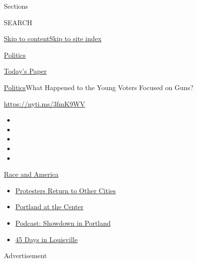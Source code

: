 Sections

SEARCH

\protect\hyperlink{site-content}{Skip to
content}\protect\hyperlink{site-index}{Skip to site index}

\href{https://www.nytimes.com/section/politics}{Politics}

\href{https://myaccount.nytimes.com/auth/login?response_type=cookie\&client_id=vi}{}

\href{https://www.nytimes.com/section/todayspaper}{Today's Paper}

\href{/section/politics}{Politics}\textbar{}What Happened to the Young
Voters Focused on Guns?

\url{https://nyti.ms/3fmK9WV}

\begin{itemize}
\item
\item
\item
\item
\item
\end{itemize}

\href{https://www.nytimes.com/news-event/george-floyd-protests-minneapolis-new-york-los-angeles?action=click\&pgtype=Article\&state=default\&region=TOP_BANNER\&context=storylines_menu}{Race
and America}

\begin{itemize}
\tightlist
\item
  \href{https://www.nytimes.com/2020/07/26/us/protests-portland-seattle-trump.html?action=click\&pgtype=Article\&state=default\&region=TOP_BANNER\&context=storylines_menu}{Protesters
  Return to Other Cities}
\item
  \href{https://www.nytimes.com/2020/07/24/us/portland-oregon-protests-white-race.html?action=click\&pgtype=Article\&state=default\&region=TOP_BANNER\&context=storylines_menu}{Portland
  at the Center}
\item
  \href{https://www.nytimes.com/2020/07/23/podcasts/the-daily/portland-protests.html?action=click\&pgtype=Article\&state=default\&region=TOP_BANNER\&context=storylines_menu}{Podcast:
  Showdown in Portland}
\item
  \href{https://www.nytimes.com/interactive/2020/07/16/us/black-lives-matter-protests-louisville-breonna-taylor.html?action=click\&pgtype=Article\&state=default\&region=TOP_BANNER\&context=storylines_menu}{45
  Days in Louisville}
\end{itemize}

Advertisement

